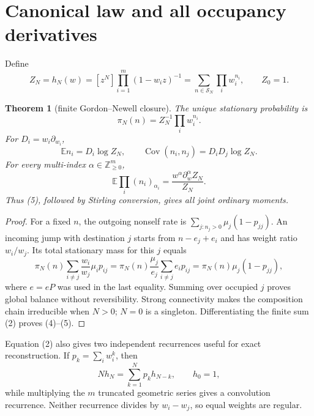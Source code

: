 \documentclass[10pt]{article}
\newtheorem{theorem}{Theorem}
\newcommand{\E}{\mathbb E}
\newcommand{\Zp}{\mathbb Z_{\geq0}}
\newcommand{\Cov}{\operatorname{Cov}}
\begin{document}
\section{Canonical law and all occupancy derivatives}
Define
\begin{equation}
 Z_N=h_N(w)=[z^N]\prod_{i=1}^m(1-w_i z)^{-1}
     =\sum_{n\in\mathcal S_N}\prod_iw_i^{n_i},\qquad Z_0=1. \tag{2}
\end{equation}

\begin{theorem}[finite Gordon--Newell closure]\label{thm:finite}
The unique stationary probability is
\begin{equation}
 \pi_N(n)=Z_N^{-1}\prod_iw_i^{n_i}.                       \tag{3}
\end{equation}
For $D_i=w_i\partial_{w_i}$,
\begin{equation}
 \E n_i=D_i\log Z_N,
 \qquad \Cov(n_i,n_j)=D_iD_j\log Z_N.                   \tag{4}
\end{equation}
For every multi-index $\alpha\in\Zp^m$,
\begin{equation}
 \E\prod_i(n_i)_{\alpha_i}
 =\frac{w^\alpha\partial_w^\alpha Z_N}{Z_N}.            \tag{5}
\end{equation}
Thus (5), followed by Stirling conversion, gives all joint ordinary moments.
\end{theorem}

\begin{proof}
For a fixed $n$, the outgoing nonself rate is
$\sum_{j:n_j>0}\mu_j(1-p_{jj})$.  An incoming jump with destination $j$
starts from $n-e_j+e_i$ and has weight ratio $w_i/w_j$.  Its total stationary
mass for this $j$ equals
\[
 \pi_N(n)\sum_{i\ne j}\frac{w_i}{w_j}\mu_ip_{ij}
 =\pi_N(n)\frac{\mu_j}{e_j}\sum_{i\ne j}e_ip_{ij}
 =\pi_N(n)\mu_j(1-p_{jj}),
\]
where $e=eP$ was used in the last equality.  Summing over occupied $j$
proves global balance without reversibility.  Strong connectivity makes the
composition chain irreducible when $N>0$; $N=0$ is a singleton.  Differentiating
the finite sum (2) proves (4)--(5).
\end{proof}

Equation (2) also gives two independent recurrences useful for exact
reconstruction.  If $p_k=\sum_iw_i^k$, then
\begin{equation}
 Nh_N=\sum_{k=1}^Np_kh_{N-k},\qquad h_0=1,                \tag{6}
\end{equation}
while multiplying the $m$ truncated geometric series gives a convolution
recurrence.  Neither recurrence divides by $w_i-w_j$, so equal weights are
regular.
\end{document}
